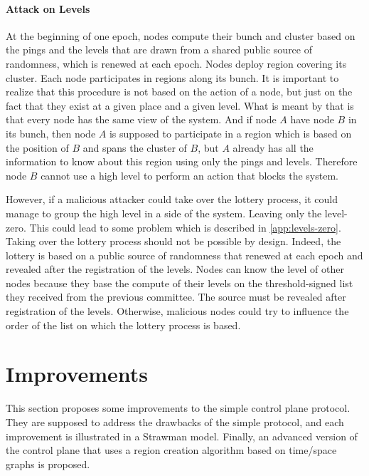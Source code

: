 \documentclass[a4paper,11pt,oneside]{report}
\begin{document}
\subsubsection{Attack on Levels} \label{sec:ControlePlane-Threat-Model}
At the beginning of one epoch, nodes compute their bunch and cluster based on
the pings and the levels that are drawn from a shared public source of
randomness, which is renewed at each epoch. Nodes deploy region covering its
cluster. Each node participates in regions along its bunch. It is important
to realize that this procedure is not based on the action of a node, but just
on the fact that they exist at a given place and a given level. What is meant
by that is that every node has the same view of the system. And if node $A$
have node $B$ in its bunch, then node $A$ is supposed to participate in a
region which is based on the position of $B$ and spans the cluster of $B$, but
$A$ already has all the information to know about this region using only the
pings and levels. Therefore node $B$ cannot use a high level to perform an
action that blocks the system. 

However, if a malicious attacker could take over the lottery process, it could
manage to group the high level in a side of the system. Leaving only the
level-zero. This could lead to some problem which is described in \autoref{app:levels-zero}.
Taking over the lottery process should not be possible by design. Indeed, the
lottery is based on a public source of randomness that renewed at each epoch
and revealed after the registration of the levels. Nodes can know the level of
other nodes because they base the compute of their levels on the
threshold-signed list they received from the previous committee. The source
must be revealed after registration of the levels. Otherwise, malicious nodes
could try to influence the order of the list on which the lottery process is
based. 

\chapter{Improvements} \label{chap:Improvements} %

This section proposes some improvements to the simple control plane protocol. They
are supposed to address the drawbacks of the simple protocol, and each improvement
is illustrated in a Strawman model. Finally, an advanced
version of the control plane that uses a region creation algorithm based on
time/space graphs is proposed. 
\end{document}

